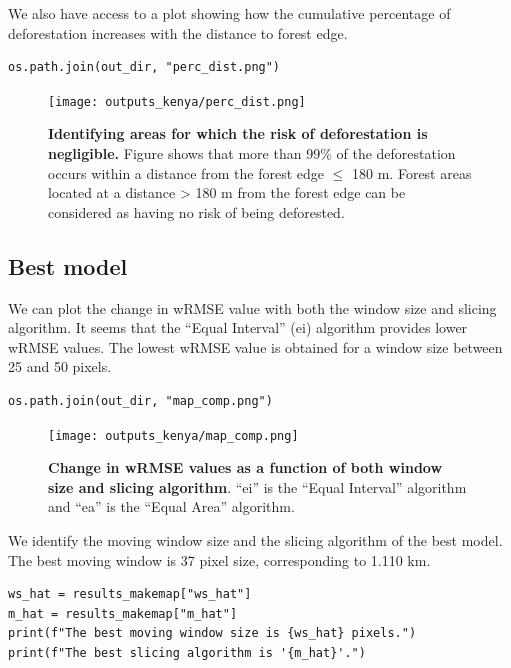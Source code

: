 \documentclass[paper=a4, 12pt, DIV=12]{scrartcl}
\begin{document}
We also have access to a plot showing how the cumulative percentage of deforestation increases with the distance to forest edge.

\begin{verbatim}
os.path.join(out_dir, "perc_dist.png")
\end{verbatim}

\begin{figure}[H]
\centering
\texttt{[image: outputs\_kenya/perc\_dist.png]}
\caption{\label{fig:org6af04b5}\textbf{Identifying areas for which the risk of deforestation is negligible.} Figure shows that more than 99\% of the deforestation occurs within a distance from the forest edge \(\leq\) 180 m. Forest areas located at a distance > 180 m from the forest edge can be considered as having no risk of being deforested.}
\end{figure}

\subsection{Best model}
\label{sec:orge48079e}

We can plot the change in wRMSE value with both the window size and slicing algorithm. It seems that the ``Equal Interval'' (ei) algorithm provides lower wRMSE values. The lowest wRMSE value is obtained for a window size between 25 and 50 pixels.

\begin{verbatim}
os.path.join(out_dir, "map_comp.png")
\end{verbatim}

\begin{figure}[H]
\centering
\texttt{[image: outputs\_kenya/map\_comp.png]}
\caption{\label{fig:orgff9928b}\textbf{Change in wRMSE values as a function of both window size and slicing algorithm}. ``ei'' is the ``Equal Interval'' algorithm and ``ea'' is the ``Equal Area'' algorithm.}
\end{figure}

We identify the moving window size and the slicing algorithm of the best model. The best moving window is 37 pixel size, corresponding to 1.110 km.

\begin{verbatim}
ws_hat = results_makemap["ws_hat"]
m_hat = results_makemap["m_hat"]
print(f"The best moving window size is {ws_hat} pixels.")
print(f"The best slicing algorithm is '{m_hat}'.")
\end{verbatim}
\end{document}
